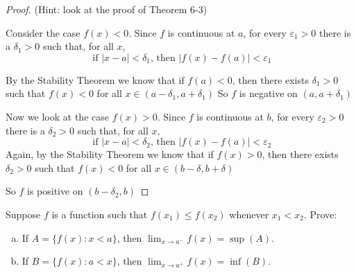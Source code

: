 \documentclass{article} %
\theoremstyle{plain}
\theoremstyle{definition}
\begin{document}
\begin{proof} (Hint: look at the proof of Theorem 6-3) 

  Consider the case $f(x)<0$. Since $f$ is continuous at $a$, for every
  $\varepsilon_1>0$ there is a $\delta_1>0$ such that, for all $x$,
  \[ \text { if }|x-a|<\delta_1 \text {, then }|f(x)-f(a)|<\varepsilon_1 \]

  By the Stability Theorem we know that if $f(a) < 0$, then there exists
  $\delta_1 > 0$ such that $f(x) < 0$ for all $x \in (a - \delta_1,
  a + \delta_1)$
  So $f$ is negative on $(a, a + \delta_1)$

  Now we look at the case $f(x)>0$. Since $f$ is continuous at $b$, for
  every $\varepsilon_2>0$ there is a $\delta_2>0$ such that, for all $x$,
  \[ \text { if }|x-a|<\delta_2 \text {, then }|f(x)-f(a)|<\varepsilon_2 \]
  Again, by the Stability Theorem we know that if $f(x) > 0$, then there
  exists $\delta_2 > 0$ such that $f(x) < 0$ for all
  $x \in (b - \delta, b + \delta)$

  So $f$ is positive on $(b - \delta_2, b)$


\end{proof} 

\newpage
\noindent{} Suppose $f$ is a function such that $f(x_1) \leq f(x_2)$ whenever $x_1< x_2$. Prove: 
\begin{enumerate}[(a)]
	\item If $A = \{ f(x) : x < a\}$, then $\lim_{x \rightarrow a^-} f(x) = \sup(A)$.
	\item If $B = \{ f(x) : a < x\}$, then $\lim_{x \rightarrow a^+} f(x) = \inf(B)$.
\end{enumerate}
\end{document}
